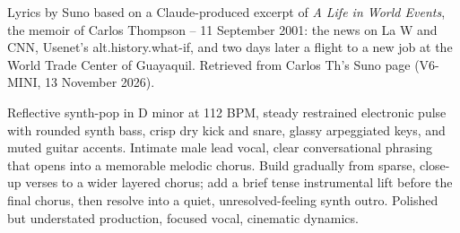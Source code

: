 
\label{sec:bound-for-guayaquil}
\begin{notes}
Lyrics by Suno based on a Claude-produced excerpt of \emph{A Life in World Events}, the memoir of Carlos Thompson -- 11 September 2001: the news on La W and CNN, Usenet's alt.history.what-if, and two days later a flight to a new job at the World Trade Center of Guayaquil. Retrieved from Carlos Th's Suno page (V6-MINI, 13 November 2026).
\end{notes}
\begin{style}
Reflective synth-pop in D minor at 112 BPM, steady restrained electronic pulse with rounded synth bass, crisp dry kick and snare, glassy arpeggiated keys, and muted guitar accents. Intimate male lead vocal, clear conversational phrasing that opens into a memorable melodic chorus. Build gradually from sparse, close-up verses to a wider layered chorus; add a brief tense instrumental lift before the final chorus, then resolve into a quiet, unresolved-feeling synth outro. Polished but understated production, focused vocal, cinematic dynamics.
\end{style}
